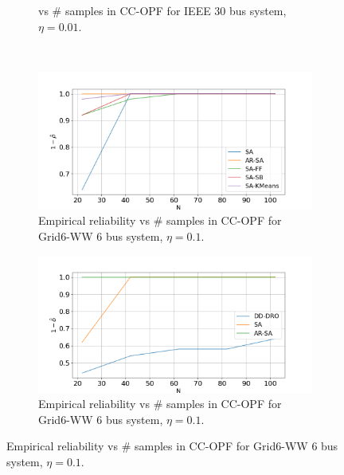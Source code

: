 \begin{figure}[hbt]
\begin{subfigure}{.50\textwidth}
{  vs $\#$ samples  in CC-OPF for IEEE 30 bus system, $\eta = 0.01$.}
  \label{fig:ieee30conservatism}
\end{subfigure}\\
\begin{subfigure}{.50\textwidth}
  \centering
  \hspace{0mm}\includegraphics[width=0.95\linewidth]{Dissertation/images/dynamic/grid6/1_beta_N_102_eta_0.1.png}
  \caption{Empirical reliability %
  vs $\#$ samples  in CC-OPF for Grid6-WW 6 bus system, $\eta = 0.1$.}
  \label{fig:grid6reliability}
\end{subfigure}
\begin{subfigure}{.50\textwidth}
  \centering
  \hspace{0mm}\includegraphics[width=0.95\linewidth]{Dissertation/images/dynamic/grid6/dd-dro/1_beta_N_102_eta_0.1.png}
  \hspace{0mm}\caption{Empirical reliability %
  vs $\#$ samples  in CC-OPF for Grid6-WW 6 bus system, $\eta = 0.1$.}
  \label{fig:grid6reliability-dd-dro}
\end{subfigure}

\end{figure}
